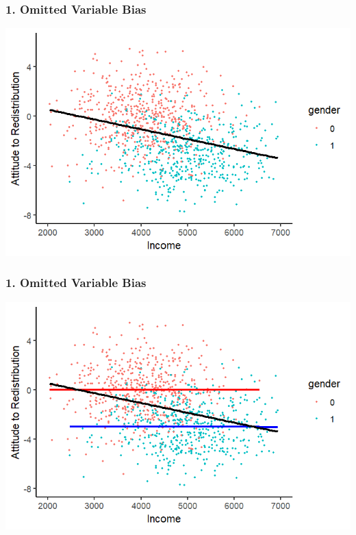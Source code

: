 \documentclass[xcolor=x11names,compress]{beamer}\usepackage[]{graphicx}\usepackage[]{color}
\makeatletter
\def\maxwidth{ %
  \ifdim\Gin@nat@width>\linewidth
    \linewidth
  \else
    \Gin@nat@width
  \fi
}
\newenvironment{knitrout}{}{} %
\renewcommand{\(}{\begin{columns}}
\renewcommand{\)}{\end{columns}}
\newcommand{\<}[1]{\begin{column}{#1}}
\renewcommand{\>}{\end{column}}
\makeatother
\begin{document}
\begin{frame}
\frametitle{1. Omitted Variable Bias}
\begin{knitrout}
\color{fgcolor}
\includegraphics[width=\maxwidth]{figure/confound2-1} 

\end{knitrout}
\end{frame}


\begin{frame}
\frametitle{1. Omitted Variable Bias}
\begin{knitrout}
\color{fgcolor}
\includegraphics[width=\maxwidth]{figure/confound3-1} 

\end{knitrout}
\end{frame}
\end{document}
